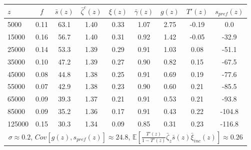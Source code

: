 \begin{tabular}{lcccccccc}
\hline
\hline
$z$ & $f$ & $\bar s(z)$ & $\bar\zeta^c(z)$ & $\xi(z)$ & $\bar\gamma(z)$ & $g(z)$ & $T'(z)$ & $s_{pref}(z)$ \\
\hline
5000 & 0.11 & 63.1 & 1.40 & 0.33 & 1.07 & 2.75 & -0.19 & 0.0 \\
15000 & 0.16 & 56.7 & 1.40 & 0.31 & 0.92 & 1.42 & -0.05 & -32.9 \\
25000 & 0.14 & 53.3 & 1.39 & 0.29 & 0.91 & 1.03 & 0.08 & -51.1 \\
35000 & 0.10 & 47.2 & 1.39 & 0.27 & 0.90 & 0.82 & 0.15 & -67.5 \\
45000 & 0.08 & 44.8 & 1.38 & 0.25 & 0.91 & 0.69 & 0.19 & -77.6 \\
55000 & 0.07 & 42.9 & 1.38 & 0.23 & 0.90 & 0.60 & 0.21 & -85.5 \\
65000 & 0.09 & 39.3 & 1.37 & 0.21 & 0.91 & 0.53 & 0.21 & -93.8 \\
85000 & 0.09 & 35.2 & 1.36 & 0.17 & 0.91 & 0.43 & 0.22 & -104.8 \\
125000 & 0.15 & 30.3 & 1.34 & 0.09 & 0.85 & 0.31 & 0.23 & -116.8 \\
\hline
\multicolumn{9}{c}{$\sigma \approx 0.2$, $Cov\left[g(z),s_{pref}(z)\right] \approx 24.8$, $\mathbb{E}\left[\frac{T'(z)}{1-T'(z)}\bar{\zeta}_{z}\bar{s}(z)\bar{\xi}_{inc}(z)\right] \approx 0.26$} \\
\hline
\hline
\end{tabular}
